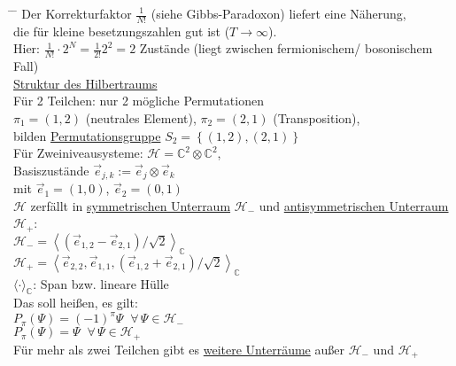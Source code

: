 \begin{tabbing}
\hspace{4em} \= \hspace{4em} \= \kill
Der Korrekturfaktor $\frac{1}{N!}$ (siehe Gibbs-Paradoxon) liefert eine Näherung,\\
die für kleine besetzungszahlen gut ist ($T \to \infty$).\\
Hier: $\frac{1}{N!}\cdot 2^N = \frac{1}{2!}2^2 = 2$ Zustände (liegt zwischen fermionischem/ bosonischem Fall)\\

\underline{Struktur des Hilbertraums}\\
Für 2 Teilchen: nur 2 mögliche Permutationen\\
\> $\pi_1 = (1,2)$ (neutrales Element), $\pi_2 = (2,1)$ (Transposition),\\
\> bilden \underline{Permutationsgruppe} $S_2 = \left\{(1,2),(2,1)\right\}$\\
Für Zweiniveausysteme: $\mathcal{H} = \mathbb{C}^2 \otimes \mathbb{C}^2$,\\
\> Basiszustände $\vec{e}_{j,k} := \vec{e}_j\otimes\vec{e}_k$\\
\> mit $\vec{e}_1 = \left(1, 0\right)$, $\vec{e}_2 = \left(0, 1\right)$\\
$\mathcal{H}$ zerfällt in \underline{symmetrischen Unterraum} $\mathcal{H}_-$ und \underline{antisymmetrischen Unterraum} $\mathcal{H}_+$:\\
\> $\mathcal{H}_- = \left\langle\left(\vec{e}_{1,2} - \vec{e}_{2,1}\right)/\sqrt{2}\right\rangle_{\mathbb{C}}$\\
\> $\mathcal{H}_+ = \left\langle \vec{e}_{2,2}, \vec{e}_{1,1}, \left(\vec{e}_{1,2} + \vec{e}_{2,1}\right)/\sqrt{2}\right\rangle_{\mathbb{C}}$\\
\> $\langle\cdot\rangle_{\mathbb{C}}$: Span bzw. lineare Hülle\\
Das soll heißen, es gilt:\\
\> $P_{\pi} (\Psi) = (-1)^{\pi} \Psi \;\; \forall\,\Psi\!\in\!\mathcal{H}_-$\\
\> $P_{\pi} (\Psi) = \Psi \;\; \forall\,\Psi\!\in\!\mathcal{H}_+$\\
Für mehr als zwei Teilchen gibt es \underline{weitere Unterräume} außer $\mathcal{H}_-$ und $\mathcal{H}_+$
\end{tabbing}


